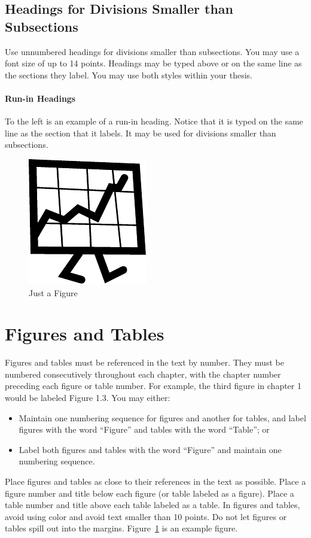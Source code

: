 \subsection{Headings for Divisions Smaller than Subsections}

Use unnumbered headings for divisions smaller than subsections.  You may use a
font size of up to 14 points.  Headings may be typed above or on the same line
as the sections they label.  You may use both styles within your thesis.

\paragraph{Run-in Headings}
To the left is an example of a run-in heading.  Notice that it is typed on the
same line as the section that it labels.  It may be used for divisions smaller
than subsections.

\begin{figure}[h]
\centering
\includegraphics{justafigure}
\caption{Just a Figure\label{fig:justafigure}}
\end{figure}

\section{Figures and Tables}

Figures and tables must be referenced in the text by number.  They must be
numbered consecutively throughout each chapter, with the chapter number
preceding each figure or table number.  For example, the third figure in
chapter 1 would be labeled Figure 1.3.  You may either:
\begin{itemize}
\item Maintain one numbering sequence for figures and another for
  tables, and label figures with the word ``Figure'' and tables with the
  word ``Table''; or
\item Label both figures and tables with the word ``Figure'' and
  maintain one numbering sequence.
\end{itemize}
Place figures and tables as close to their references in the text as
possible.  Place a figure number and title below each figure (or table
labeled as a figure).  Place a table number and title above each table
labeled as a table.  In figures and tables, avoid using color and
avoid text smaller than 10 points.  Do not let figures or tables spill
out into the margins.  Figure~\ref{fig:justafigure} is an example figure.

